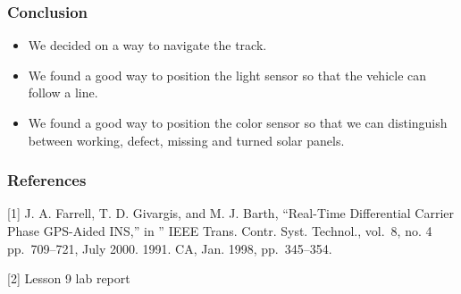 \subsubsection{Conclusion}

\begin{itemize}
\itemsep1pt\parskip0pt
\item
  We decided on a way to navigate the track.
\item
  We found a good way to position the light sensor so that the vehicle
  can follow a line.
\item
  We found a good way to position the color sensor so that we can
  distinguish between working, defect, missing and turned solar panels.
\end{itemize}

\subsubsection{References}

{[}1{]} J. A. Farrell, T. D. Givargis, and M. J. Barth, ``Real-Time
Differential Carrier Phase GPS-Aided INS,'' in '' IEEE Trans. Contr.
Syst. Technol., vol.~8, no. 4 pp.~709--721, July 2000. 1991. CA, Jan.
1998, pp.~345--354.

{[}2{]} Lesson 9 lab report
